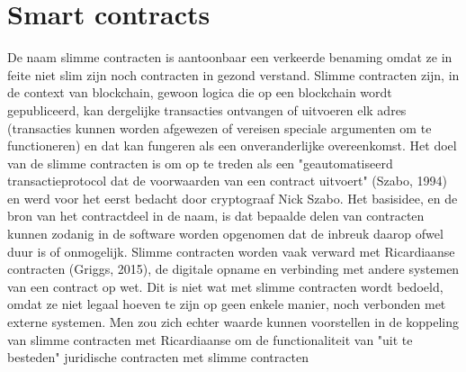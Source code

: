 \section{Smart contracts}
De naam slimme contracten is aantoonbaar een verkeerde benaming omdat ze in feite niet slim zijn noch contracten in gezond verstand. Slimme contracten zijn, in de context van blockchain, gewoon logica die op een blockchain wordt gepubliceerd, kan dergelijke transacties ontvangen of uitvoeren elk adres (transacties kunnen worden afgewezen of vereisen speciale argumenten om te functioneren) en dat kan fungeren als een onveranderlijke overeenkomst. Het doel van de slimme contracten is om op te treden als een "geautomatiseerd transactieprotocol dat de voorwaarden van een contract uitvoert" (Szabo, 1994) en werd voor het eerst bedacht door cryptograaf Nick Szabo. Het basisidee, en de bron van het contractdeel in de naam, is dat bepaalde delen van contracten kunnen zodanig in de software worden opgenomen dat de inbreuk daarop ofwel duur is of onmogelijk. Slimme contracten worden vaak verward met Ricardiaanse contracten (Griggs, 2015), de digitale opname en verbinding met andere systemen van een contract op wet. Dit is niet wat met slimme contracten wordt bedoeld, omdat ze niet legaal hoeven te zijn op geen enkele manier, noch verbonden met externe systemen. Men zou zich echter waarde kunnen voorstellen in de koppeling van slimme contracten met Ricardiaanse om de functionaliteit van "uit te besteden" juridische contracten met slimme contracten